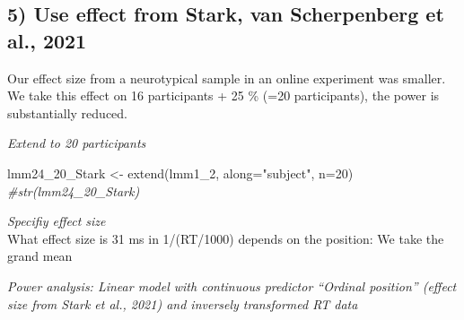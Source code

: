 \documentclass[
]{article}
\newenvironment{Shaded}{\begin{snugshade}}{\end{snugshade}}
\newcommand{\AttributeTok}[1]{\textcolor[rgb]{0.77,0.63,0.00}{#1}}
\newcommand{\CommentTok}[1]{\textcolor[rgb]{0.56,0.35,0.01}{\textit{#1}}}
\newcommand{\DecValTok}[1]{\textcolor[rgb]{0.00,0.00,0.81}{#1}}
\newcommand{\FunctionTok}[1]{\textcolor[rgb]{0.00,0.00,0.00}{#1}}
\newcommand{\NormalTok}[1]{#1}
\newcommand{\OtherTok}[1]{\textcolor[rgb]{0.56,0.35,0.01}{#1}}
\newcommand{\SpecialCharTok}[1]{\textcolor[rgb]{0.00,0.00,0.00}{#1}}
\newcommand{\StringTok}[1]{\textcolor[rgb]{0.31,0.60,0.02}{#1}}
\begin{document}
\hypertarget{use-effect-from-stark-van-scherpenberg-et-al.-2021-1}{%
\subsection{5) Use effect from Stark, van Scherpenberg et al.,
2021}\label{use-effect-from-stark-van-scherpenberg-et-al.-2021-1}}

Our effect size from a neurotypical sample in an online experiment was
smaller. We take this effect on 16 participants + 25 \% (=20
participants), the power is substantially reduced.

\emph{Extend to 20 participants}

\begin{Shaded}
\begin{Highlighting}[]
\NormalTok{lmm24\_20\_Stark }\OtherTok{\textless{}{-}} \FunctionTok{extend}\NormalTok{(lmm1\_2, }\AttributeTok{along=}\StringTok{"subject"}\NormalTok{, }\AttributeTok{n=}\DecValTok{20}\NormalTok{)}
\CommentTok{\#str(lmm24\_20\_Stark)}
\end{Highlighting}
\end{Shaded}

\emph{Specifiy effect size}\\
What effect size is 31 ms in 1/(RT/1000) depends on the position: We
take the grand mean

\begin{Shaded}
\end{Shaded}

\emph{Power analysis: Linear model with continuous predictor ``Ordinal
position'' (effect size from Stark et al., 2021) and inversely
transformed RT data}
\end{document}
